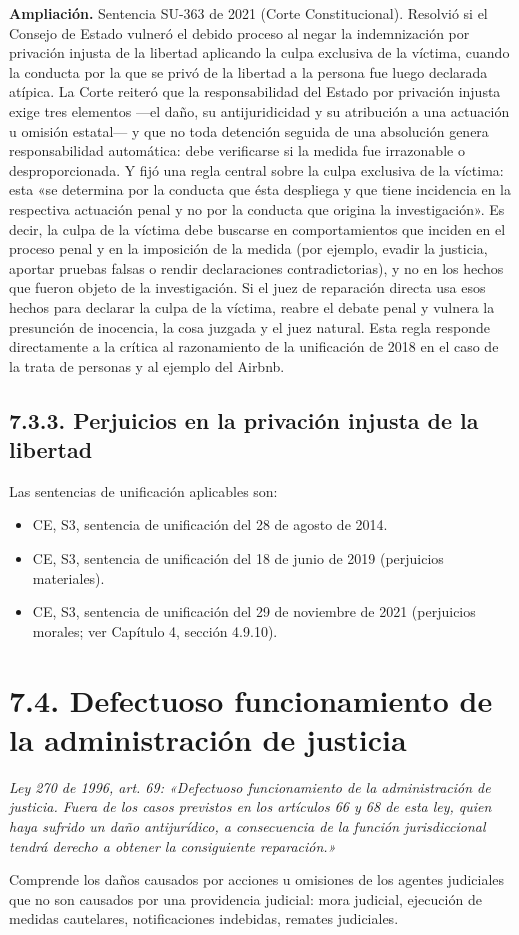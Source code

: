 \begin{ampliacion}
\textcolor[HTML]{5B3F8C}{\textbf{Ampliación. }}Sentencia SU-363 de 2021 (Corte Constitucional). Resolvió si el Consejo de Estado vulneró el debido proceso al negar la indemnización por privación injusta de la libertad aplicando la culpa exclusiva de la víctima, cuando la conducta por la que se privó de la libertad a la persona fue luego declarada atípica. La Corte reiteró que la responsabilidad del Estado por privación injusta exige tres elementos —el daño, su antijuridicidad y su atribución a una actuación u omisión estatal— y que no toda detención seguida de una absolución genera responsabilidad automática: debe verificarse si la medida fue irrazonable o desproporcionada. Y fijó una regla central sobre la culpa exclusiva de la víctima: esta «se determina por la conducta que ésta despliega y que tiene incidencia en la respectiva actuación penal y no por la conducta que origina la investigación». Es decir, la culpa de la víctima debe buscarse en comportamientos que inciden en el proceso penal y en la imposición de la medida (por ejemplo, evadir la justicia, aportar pruebas falsas o rendir declaraciones contradictorias), y no en los hechos que fueron objeto de la investigación. Si el juez de reparación directa usa esos hechos para declarar la culpa de la víctima, reabre el debate penal y vulnera la presunción de inocencia, la cosa juzgada y el juez natural. Esta regla responde directamente a la crítica al razonamiento de la unificación de 2018 en el caso de la trata de personas y al ejemplo del Airbnb.
\end{ampliacion}
\subsection{7.3.3. Perjuicios en la privación injusta de la libertad}
Las sentencias de unificación aplicables son:

\begin{itemize}
\item CE, S3, sentencia de unificación del 28 de agosto de 2014.
\item CE, S3, sentencia de unificación del 18 de junio de 2019 (perjuicios materiales).
\item CE, S3, sentencia de unificación del 29 de noviembre de 2021 (perjuicios morales; ver Capítulo 4, sección 4.9.10).
\end{itemize}
\section{7.4. Defectuoso funcionamiento de la administración de justicia}
\begin{cita}
\textit{Ley 270 de 1996, art. 69: «Defectuoso funcionamiento de la administración de justicia. Fuera de los casos previstos en los artículos 66 y 68 de esta ley, quien haya sufrido un daño antijurídico, a consecuencia de la función jurisdiccional tendrá derecho a obtener la consiguiente reparación.»}
\end{cita}
Comprende los daños causados por acciones u omisiones de los agentes judiciales que no son causados por una providencia judicial: mora judicial, ejecución de medidas cautelares, notificaciones indebidas, remates judiciales.

